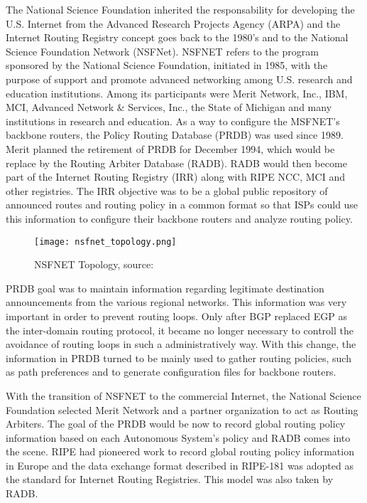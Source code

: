 \documentclass[11pt,a4paper]{scrreprt}
\begin{document}
The National Science Foundation inherited the responsability for developing the U.S. Internet from the Advanced Research Projects Agency (ARPA) and the Internet Routing Registry concept goes back to the 1980's and to the National Science Foundation Network (NSFNet).  NSFNET refers to the program sponsored by the National Science Foundation, initiated in 1985, with the purpose of support and promote advanced networking among U.S. research and education institutions. Among its participants were Merit Network, Inc., IBM, MCI, Advanced Network \& Services, Inc., the State of Michigan and many institutions in research and education. As a way to configure the MSFNET's backbone routers, the Policy Routing Database (PRDB) was used since 1989. Merit planned the retirement of PRDB for December 1994, which would be replace by the Routing Arbiter Database (RADB). RADB would then become part of the Internet Routing Registry (IRR) along with RIPE NCC, MCI and other registries. The IRR objective was to be a global public repository of announced routes and routing policy in a common format so that ISPs could use this information to configure their backbone routers and analyze routing policy.

\begin{figure}[!h]
\centering
\texttt{[image: nsfnet\_topology.png]}
\caption{NSFNET Topology, source: \cite{NSFNET_Topology}}
\label{fig:nfsnet_image}
\end{figure}


PRDB goal was to maintain information regarding legitimate destination announcements from the various regional networks. This information was very important in order to prevent routing loops. Only after BGP replaced EGP as the inter-domain routing protocol, it became no longer necessary to controll the avoidance of routing loops in such a administratively way. With this change, the information in PRDB turned to be mainly used to gather routing policies, such as path preferences and to generate configuration files for backbone routers.

With the transition of NSFNET to the commercial Internet, the National Science Foundation selected Merit Network and a partner organization to act as Routing Arbiters. The goal of the PRDB would be now to record global routing policy information based on each Autonomous System's policy and RADB comes into the scene. RIPE had pioneered work to record global routing policy information in Europe and the data exchange format described in RIPE-181 \cite{RFC_1786} was adopted as the standard for Internet Routing Registries. This model was also taken by RADB. 
\end{document}

